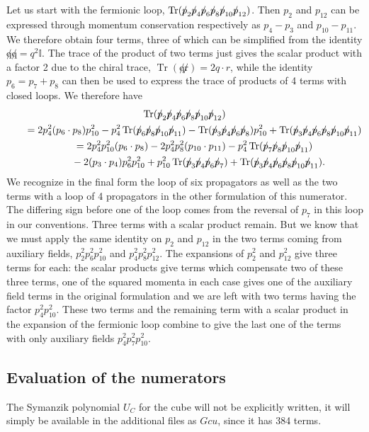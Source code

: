\documentclass[pdftex]{sigma}
\numberwithin{equation}{section}
\def\dirp{{\slash \mkern -9mu p}}
\DeclareMathOperator{\Tr}{Tr}
\begin{document}
Let us start with the fermionic loop, $\Tr( \dirp_2\dirp_4\dirp_6\dirp_8\dirp_{10}\dirp_{12}) $.
Then $p_2$ and $p_{12}$ can be expressed through momentum conservation respectively as $p_4 - p_3$ and $p_{10} -
p_{11}$. We therefore obtain four terms, three of which can be simplified from the identity ${\not q \not q} = q^2
\mathbb I$. The trace of the product of two terms just gives the scalar product with a factor 2 due to the chiral trace,
${\Tr ( \not q \not r)} = 2 q\cdot r$, while the identity $p_6 = p_7 + p_8$ can then be used to express the trace
of products of 4 terms with closed loops. We therefore have
\begin{gather*}
 \Tr( \dirp_2\dirp_4\dirp_6\dirp_8\dirp_{10}\dirp_{12}) \\
\qquad = 2 p_4^2 (p_6\cdot p_8) p_{10}^2 - p_4^2 \Tr(\dirp_6\dirp_8\dirp_{10}\dirp_{11})
	- \Tr(\dirp_3\dirp_4\dirp_6\dirp_8) p_{10}^2
+ \Tr( \dirp_3\dirp_4\dirp_6\dirp_8\dirp_{10}\dirp_{11}) \\
 \qquad= 2 p_4^2 p_{10}^2 (p_6\cdot p_8) - 2 p_4^2 p_8^2 (p_{10}\cdot p_{11})
- p_4^2 \Tr(\dirp_7\dirp_8\dirp_{10}\dirp_{11}) \\
\phantom{\qquad =}{} - 2 (p_3\cdot p_4) p_6^2 p_{10}^2 + p_{10}^2 \Tr(\dirp_3\dirp_4\dirp_6\dirp_7)
	+ \Tr( \dirp_3\dirp_4\dirp_6\dirp_8\dirp_{10}\dirp_{11}) .
\end{gather*}
We recognize in the final form the loop of six propagators as well as the two terms with a loop of 4 propagators in the
other formulation of this numerator. The differing sign before one of the loop comes from the reversal of $p_7$ in this
loop in our conventions. Three terms with a scalar product remain. But we know that we must apply the same identity on
$p_2$ and $p_{12}$ in the two terms coming from auxiliary fields, $p_2^2 p_6^2 p_{10}^2$ and $p_4^2 p_8^2
 p_{12}^2$. The expansions of $p_2^2$ and $p_{12}^2$ give three terms for each: the scalar products give terms which
compensate two of these three terms, one of the squared momenta in each case gives one of the auxiliary field terms in the
original formulation and we are left with two terms having the factor $p_4^2 p_{10}^2$. These two terms and the
remaining term with a scalar product in the expansion of the fermionic loop combine to give the last one of the terms with
only auxiliary fields $p_4^2 p_7^2 p_{10}^2$.

\subsection{Evaluation of the numerators}
The Symanzik polynomial $U_C$ for the cube will not be explicitly written, it will simply be available in the
additional files as $Gcu$, since it has 384 terms.
\end{document}
